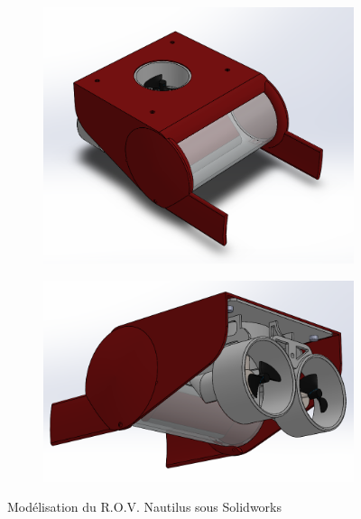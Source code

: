 \documentclass[a4paper,11pt]{report}
\begin{document}
					\begin{figure}[!h]
						\centering
							\begin{subfigure}[b]{0.5\textwidth}
								\includegraphics[width=\textwidth]{Photos/Capture1.png}
							\end{subfigure}
							\begin{subfigure}[b]{0.5\textwidth}
								\includegraphics[width=\textwidth]{Photos/Capture2.png}
							\end{subfigure}
							\caption{Modélisation du R.O.V. Nautilus sous Solidworks}
					\end{figure}
					
\end{document}
